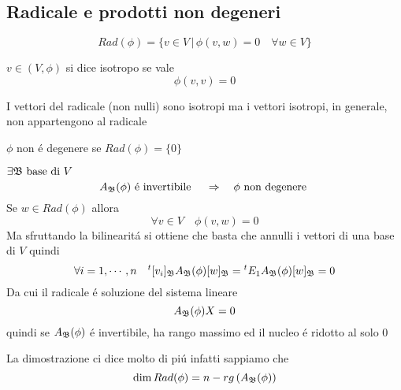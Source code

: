 \subsection{Radicale e prodotti non degeneri}

\begin{defn}
$$Rad(\phi) = \{ v \in V \, \vert \, \phi(v,w) =0 \quad \forall w \in V \} $$
\end{defn}
\begin{defn}\bianco
$v \in (V, \phi) $ si dice isotropo se vale
$$ \phi (v,v)=0$$
\end{defn}

\begin{oss} I vettori del radicale (non nulli) sono isotropi ma i vettori isotropi, in generale, non appartengono al radicale 
\end{oss}

\begin{defn}\bianco
$\phi$ non \'e degenere se $Rad(\phi) =\{ 0 \} $
\end{defn}
\spazio
\begin{lem}
 $ \exists \mathfrak{B} \text{ base di } V $   
 $$ A_{\mathfrak{B}} ( \phi) \text{   \'e invertibile } \quad \Rightarrow \quad \phi \text{ non  degenere }$$
\proof
Se $w \in Rad (\phi) $ allora
$$ \forall v \in V \quad \phi(v,w)=0 $$
Ma sfruttando la bilinearit\'a si ottiene che basta che annulli i vettori di una base di $V$ quindi
$$ \forall i =1, \cdots , n \quad {}^t [v_i]_{\mathfrak{B}} A_{\mathfrak{B}}(\phi) [w]_{\mathfrak{B}} = {}^t E_1 A_{\mathfrak{B}} (\phi) [w]_{\mathfrak{B}}=0$$ 
Da cui il radicale \'e soluzione del sistema lineare
$$ A_{\mathfrak{B}}(\phi) X =0 $$ 
quindi se $A_{\mathfrak{B}}(\phi) $ \'e invertibile, ha rango massimo ed il nucleo \'e ridotto al solo 0
\endproof
\begin{oss}La dimostrazione ci dice molto di pi\'u infatti sappiamo che 
$$\dim Rad(\phi) = n - rg\left( A_{\mathfrak{B}} (\phi) \right) $$ 
\end{oss}
\end{lem}
\spazio
